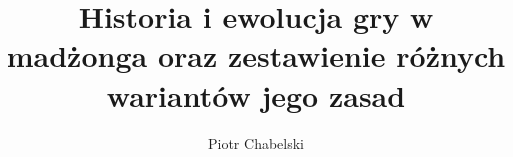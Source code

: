 \documentclass[hidelinks,12pt]{wzmgr}
\author{Piotr Chabelski}
\title{Historia i ewolucja gry w madżonga oraz zestawienie różnych wariantów
jego zasad}
\begin{document}
\onehalfspacing
\maketitle

%




\printindex


\end{document}
